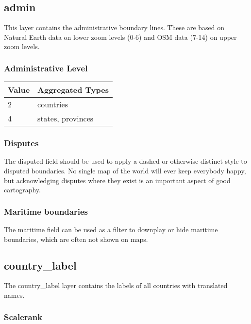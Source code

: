 \subsection*{admin}\label{admin}

This layer contains the administrative boundary lines. These are based
on Natural Earth data on lower zoom levels (0-6) and OSM data (7-14) on
upper zoom levels.

\subsubsection*{Administrative Level}\label{administrative-level}

\begin{table}[H]
\label{my-label}
\begin{tabular}{l | l}
Value & Aggregated Types  \\ \hline
2     & countries         \\
4     & states, provinces
\end{tabular}
\end{table}

\subsubsection*{Disputes}\label{disputes}

The disputed field should be used to apply a dashed or otherwise
distinct style to disputed boundaries. No single map of the world will
ever keep everybody happy, but acknowledging disputes where they exist
is an important aspect of good cartography.

\subsubsection*{Maritime boundaries}\label{maritime-boundaries}

The maritime field can be used as a filter to downplay or hide maritime
boundaries, which are often not shown on maps.

\subsection*{country\_label}\label{country_label}

The country\_label layer contains the labels of all countries with
translated names.

\subsubsection*{Scalerank}\label{scalerank}

